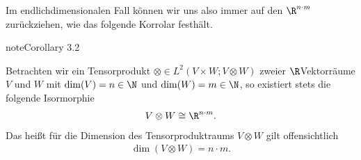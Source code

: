 \documentclass[letterpaper,10pt,german]{jupyterBook}
\begin{document}
\sphinxAtStartPar
Im endlich\sphinxhyphen{}dimensionalen Fall können wir uns also immer auf den \(\R^{n \cdot m}\) zurückziehen, wie das folgende Korrolar festhält.
\label{vektoranalysis/tensor:cor:isomorphieEndlichDimensional}
\begin{sphinxadmonition}{note}{Corollary 3.2}



\sphinxAtStartPar
Betrachten wir ein Tensorprodukt \(\otimes \in L^2(V \times W; V \otimes W)\) zweier  \(\R\)\sphinxhyphen{}Vektorräume \(V\) und \(W\) mit \(\operatorname{dim}(V)=n \in \N\) und \(\operatorname{dim}(W)=m \in \N\), so existiert stets die folgende Isormorphie
\begin{equation*}
\begin{split}V \otimes W \cong \R^{n \cdot m}.\end{split}
\end{equation*}
\sphinxAtStartPar
Das heißt für die Dimension des Tensorproduktraums \(V \otimes W\) gilt offensichtlich
\begin{equation*}
\begin{split}\operatorname{dim}(V \otimes W) = n\cdot m.\end{split}
\end{equation*}\end{sphinxadmonition}
\end{document}
